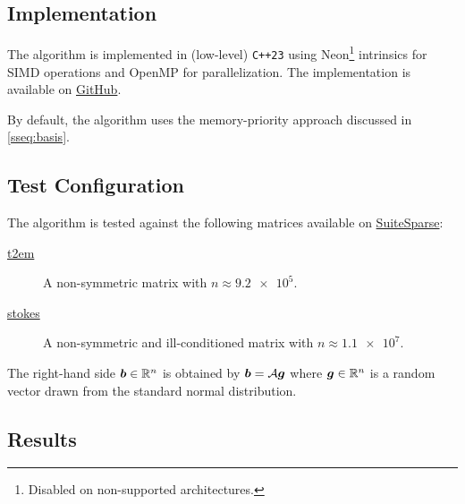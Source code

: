 \subsection{Implementation}

The algorithm is implemented in (low-level) \lstinline{C++23} using Neon\footnote{Disabled on non-supported architectures.} intrinsics for SIMD operations and OpenMP for parallelization. The implementation is available on \href{https://github.com/diantonioandrea/NASS}{GitHub}.

By default, the algorithm uses the memory-priority approach discussed in \cref{sseq:basis}.

\subsection{Test Configuration}

The algorithm is tested against the following matrices available on \href{https://sparse.tamu.edu}{SuiteSparse}:

\begin{description}
    \item[\href{https://sparse.tamu.edu/CEMW/t2em}{t2em}] A non-symmetric matrix with $n \approx \num{9.2e5}$.
    \item[\href{https://sparse.tamu.edu/VLSI/stokes}{stokes}] A non-symmetric and ill-conditioned matrix with $n \approx \num{1.1e7}$.
\end{description}

The right-hand side $\bm{b} \in \mathbb{R}^{n}$ is obtained by $\bm{b} = \mathcal{A} \bm{g}$ where $\bm{g} \in \mathbb{R}^{n}$ is a random vector drawn from the standard normal distribution.

\newpage
\subsection{Results}

